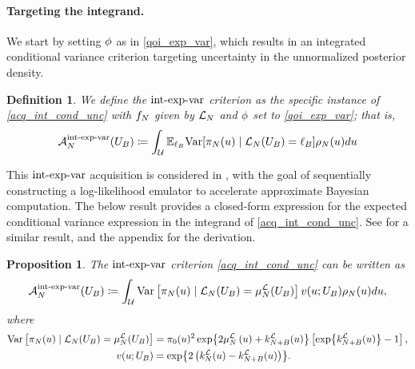 \documentclass[12pt]{article}
\newtheorem{definition}{Definition}
\newtheorem{prop}{Proposition}
\begin{document}
\paragraph{Targeting the integrand.}
We start by setting $\qoiMap$ as in \ref{qoi_exp_var}, which results in an integrated conditional 
variance criterion targeting uncertainty in the unnormalized posterior density.
\begin{definition}
We define the $\intExpVarLabel$ criterion as the specific instance of \ref{acq_int_cond_unc} with 
$\funcEm$ given by $\llikEm$ and $\qoiMap$ set to \ref{qoi_exp_var}; that is, 
\begin{equation}
\labelAcq[\Ndesign]{\intExpVarLabel}(\designBatchIn) \Def
\int_{\parSpace} \E_{\designBatchLlik} \Var[\llikEmRdmDens[\Ndesign](\Par) \given 
\llikEm[\Ndesign](\designBatchIn) = \designBatchLlik] \weightDens(\Par) d\Par \label{acq_int_cond_unc}
\end{equation}
\end{definition}

This $\intExpVarLabel$ acquisition is considered in \cite{VehtariParallelGP}, with the goal of sequentially 
constructing a log-likelihood emulator to accelerate approximate Bayesian computation. The below result
provides a closed-form expression for the expected conditional variance expression in the 
integrand of \ref{acq_int_cond_unc}. See 
\cite{VehtariParallelGP} for a similar result, and the appendix for the derivation.

\begin{prop} \label{prop:int_exp_var_closed_form}
The $\intExpVarLabel$ criterion \ref{acq_int_cond_unc} can be written as  
\begin{equation*}
\labelAcq[\Ndesign]{\intExpVarLabel}(\designBatchIn) \Def
\int_{\parSpace}  \Var\left[\llikEmRdmDens[\Ndesign](\Par) \given
 \llikEm[\Ndesign](\designBatchIn) = \emMean[\Ndesign]{\llik}(\designBatchIn)\right]
\varInflation(\Par; \designBatchIn) \weightDens(\Par) d\Par,
\end{equation*}
where 
\begin{align}
\Var\left[\llikEmRdmDens[\Ndesign](\Par) \given \llikEm[\Ndesign](\designBatchIn) = \emMean[\Ndesign]{\llik}(\designBatchIn)\right]
&= \priorDens(\Par)^2 \Exp{2\emMean[\Ndesign]{\llik}\left(\Par\right) + \emKer[\Naugment]{\llik}(\Par)} 
\left[\Exp{\emKer[\Naugment]{\llik}(\Par)} - 1 \right], \nonumber \\
\varInflation(\Par; \designBatchIn)
&= \Exp{2\left(\emKer[\Ndesign]{\llik}(\Par) - \emKer[\Naugment]{\llik}(\Par)\right)}.
\end{align}
\end{prop}
\end{document}
